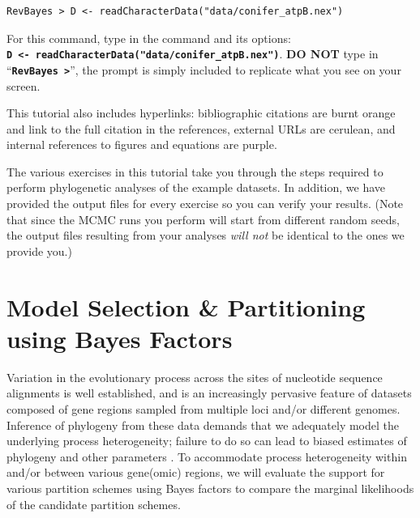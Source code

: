 \documentclass[11pt]{article}
\newcommand{\taha}[1]{{\textcolor{red}{[TAH comment: #1]}}} %
\newcommand{\cl}[1]{{\texttt{\textbf{#1}}}}
\begin{document}
{\tt \begin{snugshade*}
\begin{lstlisting}
RevBayes > D <- readCharacterData("data/conifer_atpB.nex")
\end{lstlisting}
\end{snugshade*}}

For this command, type in the command and its options:\\ \cl{D <- readCharacterData("data/conifer\_atpB.nex")}. \textbf{DO NOT} type in ``\cl{RevBayes >}'', the prompt is simply included to replicate what you see on your screen. 

%


This tutorial also includes hyperlinks: bibliographic citations are {\textcolor{citescol}{burnt orange}} and link to the full citation in the references, external URLs are {\textcolor{urlscol}{cerulean}}, and internal references to figures and equations are {\textcolor{linkscol}{purple}}.

The various exercises in this tutorial take you through the steps required to perform phylogenetic analyses of the example datasets. 
In addition, we have provided the output files for every exercise so you can verify your results. (Note that since the MCMC runs you perform will start from different random seeds, the output files resulting from your analyses \textit{will not} be identical to the ones we provide you.)

\exs{Download data and output files from: \taha{add link to data files}
}

\bigskip
\section{Model Selection \& Partitioning using Bayes Factors}

Variation in the evolutionary process across the sites of nucleotide 
sequence alignments is well established, and is an increasingly pervasive feature of datasets 
composed of gene regions sampled from multiple loci and/or different genomes.
Inference of phylogeny from these data demands that we adequately model the underlying process heterogeneity; 
failure to do so can lead to biased estimates of phylogeny and other parameters \citep{brown07}.
To accommodate process heterogeneity within and/or between various gene(omic)
regions, we will evaluate the support for various partition schemes 
using Bayes factors to compare the marginal likelihoods of the candidate partition schemes.
\end{document}
